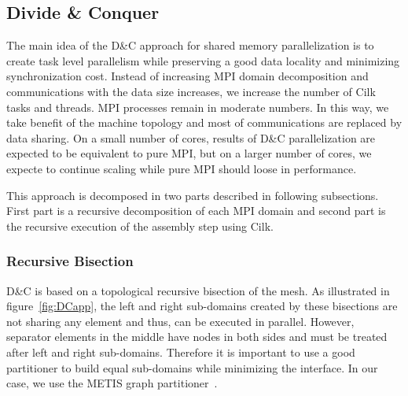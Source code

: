 \documentclass{IOS-Book-Article}
\begin{document}
\subsection{Divide \& Conquer}
%

The main idea of the D\&C approach for shared memory parallelization is to create task level parallelism while preserving a good data locality and minimizing synchronization cost.
Instead of increasing MPI domain decomposition and communications with the data size increases, we increase the number of Cilk tasks and threads. MPI processes remain
in moderate numbers.
In this way, we take benefit of the machine topology and most of communications are replaced by data sharing.
On a small number of cores, results of D\&C parallelization are expected to be equivalent to pure MPI, but on a larger number of cores, we expecte to continue scaling
while pure MPI should loose in performance.

This approach is decomposed in two parts described in following subsections.
First part is a recursive decomposition of each MPI domain and second part is the recursive execution of the assembly step using Cilk.

\subsubsection{Recursive Bisection}
\label{sec:DCrec}
D\&C is based on a topological recursive bisection of the mesh.
As illustrated in figure~\ref{fig:DCapp}, the left and right sub-domains created by these bisections are not sharing any element and thus, can be executed in parallel.
However, separator elements in the middle have nodes in both sides and must be treated after left and right sub-domains.
Therefore it is important to use a good partitioner to build equal sub-domains while minimizing the interface. In our case, we use the METIS graph partitioner~\cite{Metis}.
\end{document}
